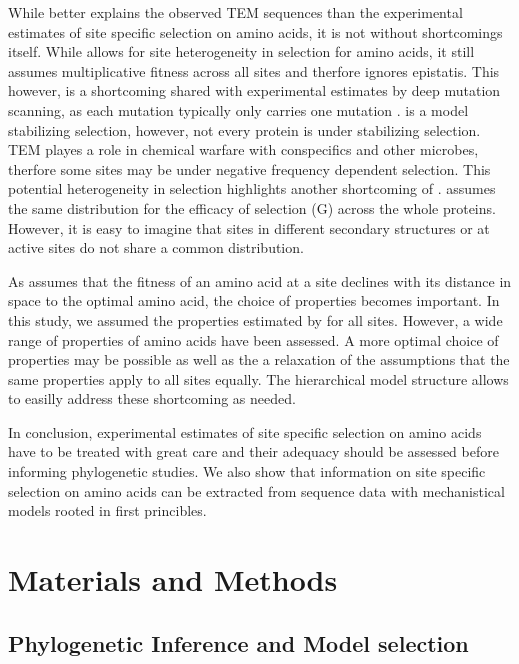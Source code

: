 \documentclass[12pt]{article}
\begin{document}
While \selac better explains the observed TEM sequences than the experimental estimates of site specific selection on amino acids, it is not without shortcomings itself.
While \selac allows for site heterogeneity in selection for amino acids, it still assumes multiplicative fitness across all sites and therfore ignores epistatis.
This however, is a shortcoming shared with experimental estimates by deep mutation scanning, as each mutation typically only carries one mutation \citep{FirnbergAndOstermeier2012, Jain2014}.
\selac is a model stabilizing selection, however, not every protein is under stabilizing selection.
TEM playes a role in chemical warfare with conspecifics and other microbes, therfore some sites may be under negative frequency dependent selection.
This potential heterogeneity in selection highlights another shortcoming of \selac.
\selac assumes the same distribution for the efficacy of selection (G) across the whole proteins.
However, it is easy to imagine that sites in different secondary structures or at active sites do not share a common distribution.

As \selac assumes that the fitness of an amino acid at a site declines with its distance in \PC space to the optimal amino acid, the choice of \PC properties becomes important.
In this study, we assumed the \PC properties estimated by \citet{grantham1974} for all sites.
However, a wide range of \PC properties of amino acids have been assessed.
A more optimal choice of \PC properties may be possible as well as the a relaxation of the assumptions that the same properties apply to all sites equally.
The hierarchical model structure allows to easilly address these shortcoming as needed.

In conclusion, experimental estimates of site specific selection on amino acids have to be treated with great care and their adequacy should be assessed before informing phylogenetic studies.
We also show that information on site specific selection on amino acids can be extracted from sequence data with mechanistical models rooted in first princibles.

\section*{Materials and Methods}

\subsection*{Phylogenetic Inference and Model selection}
\end{document}
